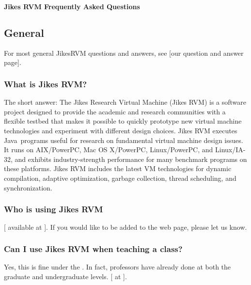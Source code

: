 \begin{center}  
{\bf Jikes RVM Frequently Asked Questions}
\end{center}

\subsection{General}

For most general Jikes\TMweb RVM questions and answers, see
\xlink*{\texttt{\QandAURL}}[our question and answer page]{\QandAURL}.

\subsubsection{What is Jikes RVM?} 

The short answer:
The Jikes Research Virtual Machine (Jikes RVM) is a software project
designed to provide the academic and research communities with a
flexible testbed that makes it possible to quickly prototype new
virtual machine technologies and experiment with different design
choices.  Jikes RVM executes Java\TMweb\ programs useful for research on
fundamental virtual machine design issues.
It runs on AIX\TMweb{}/PowerPC\TMweb{}, Mac OS X/PowerPC,
Linux\Rweb{}/PowerPC, and Linux/IA-32, 
and exhibits industry-strength performance for many benchmark programs
on these platforms.  Jikes RVM includes the latest VM
technologies for dynamic compilation, adaptive optimization, garbage
collection, thread scheduling, and synchronization.

\subsubsection{Who is using Jikes RVM}

[ available at
{\tt \RVMUsersURL}]{\RVMUsersURL}.  If you would like to 
be added to the web page, please let us know.

\subsubsection{Can I use Jikes RVM when teaching a class?}

Yes, this is fine under the
.  In fact,  professors
have already done at both the graduate and undergraduate levels.
[ at {\tt \RVMTeachingResourcesURL}]{\RVMTeachingResourcesURL}.

